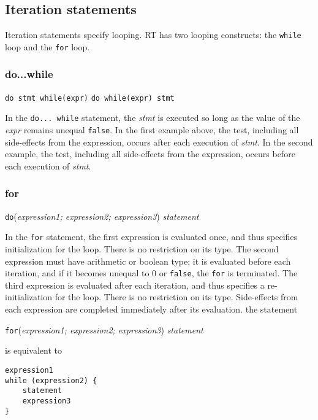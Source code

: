 \subsection{Iteration statements}
Iteration statements specify looping.  RT has two looping constructs: the
\texttt{while} loop and the \texttt{for} loop.

\subsubsection{do...while}
\begin{center}
\texttt{do stmt while(expr)}
\texttt{do while(expr) stmt}
\end{center}
In the \texttt{do... while} statement, the \textsl{stmt} is executed so long as the
value of the \textsl{expr} remains unequal \texttt{false}. In the first example above, the test, 
including all side-effects from the expression, occurs after each execution of \textsl{stmt}. In 
the second example, the test, including all side-effects from the expression, occurs before each 
execution of \textsl{stmt}.

\subsubsection{for}
\begin{center}
\texttt{do}(\textsl{expression1; expression2; expression3}) \textsl{statement}
\end{center}
In the \texttt{for} statement, the first expression is evaluated once, and thus specifies
initialization for the loop.  There is no restriction on its type.  The second expression
must have arithmetic or boolean type; it is evaluated before each iteration, and if it
becomes unequal to 0 or \texttt{false}, the \texttt{for} is terminated.  The third
expression is evaluated after each iteration, and thus specifies a re-initialization
for the loop.  There is no restriction on its type.  Side-effects from each expression
are completed immediately after its evaluation.  the statement
\begin{center}
\texttt{for}(\textsl{expression1; expression2; expression3}) \textsl{statement}
\end{center}

is equivalent to

\begin{verbatim}
expression1
while (expression2) {
    statement
    expression3
}
\end{verbatim}

